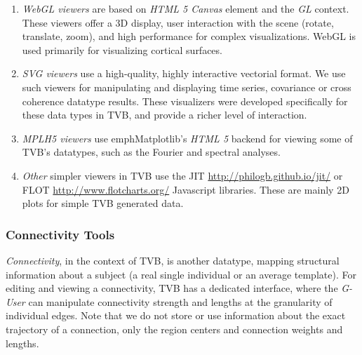 \documentclass{bioinfo}
\begin{document}
	\begin{enumerate}
		\item \emph{WebGL viewers} are based on \emph{HTML 5 Canvas} element
		and the \emph{GL} context. These viewers offer a 3D display,
		 user interaction with the scene (rotate,
		translate, zoom), and high performance for complex visualizations.
        WebGL is used primarily for visualizing cortical surfaces.
		
		\item \emph{SVG viewers} use a high-quality, highly interactive vectorial 
            format. We
		use such viewers for manipulating and displaying time series,
		covariance or cross coherence datatype results. These visualizers
		were developed specifically for these data types in TVB, and provide a 
		richer level of interaction.

		\item \emph{MPLH5 viewers} use  emph{Matplotlib}'s \emph{HTML 5}
		backend for viewing some of TVB's datatypes, such as
		the Fourier and spectral analyses. 

		\item \emph{Other} simpler viewers in TVB use the JIT
		\url{http://philogb.github.io/jit/} or FLOT
		\url{http://www.flotcharts.org/} Javascript libraries. These are mainly
		2D plots for simple TVB generated data.
	\end{enumerate}

\subsubsection{Connectivity Tools}

		\emph{Connectivity}, in the context of TVB, is another datatype, mapping structural
		information about a subject (a real single individual or an average template). For
		editing and viewing a connectivity, TVB has a dedicated interface, where
		the \emph{G-User} can manipulate connectivity strength and lengths
		at the granularity of individual edges.
        Note that we do not store or use information about the exact trajectory of
		a connection, only the region centers and connection weights and
		lengths.
\end{document}
